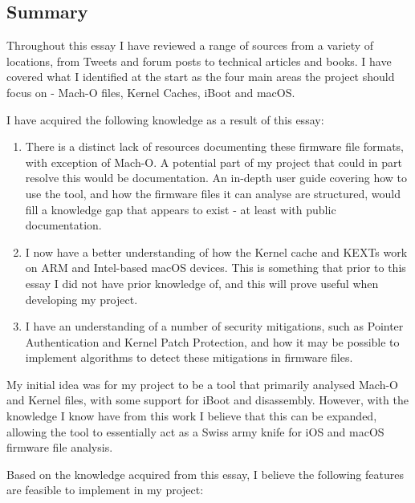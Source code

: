 \subsection{Summary}


Throughout this essay I have reviewed a range of sources from a variety of locations, from Tweets and forum posts to technical articles and books. I have covered what I identified at the start as the four main areas the project should focus on - Mach-O files, Kernel Caches, iBoot and macOS. 

I have acquired the following knowledge as a result of this essay:

\begin{enumerate}
	\item There is a distinct lack of resources documenting these firmware file formats, with exception of Mach-O. A potential part of my project that could in part resolve this would be documentation. An in-depth user guide covering how to use the tool, and how the firmware files it can analyse are structured, would fill a knowledge gap that appears to exist - at least with public documentation.
	\item I now have a better understanding of how the Kernel cache and KEXTs work on ARM and Intel-based macOS devices. This is something that prior to this essay I did not have prior knowledge of, and this will prove useful when developing my project. 
	\item I have an understanding of a number of security mitigations, such as Pointer Authentication and Kernel Patch Protection, and how it may be possible to implement algorithms to detect these mitigations in firmware files.
\end{enumerate}

My initial idea was for my project to be a tool that primarily analysed Mach-O and Kernel files, with some support for iBoot and disassembly. However, with the knowledge I know have from this work I believe that this can be expanded, allowing the tool to essentially act as a Swiss army knife for iOS and macOS firmware file analysis. 

Based on the knowledge acquired from this essay, I believe the following features are feasible to implement in my project:

